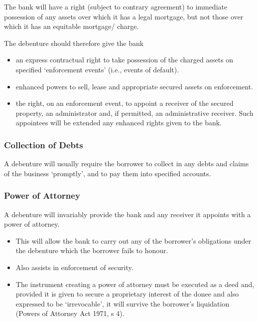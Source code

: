 \documentclass[
]{article}
\providecommand{\tightlist}{%
  \setlength{\itemsep}{0pt}\setlength{\parskip}{0pt}}
\begin{document}
The bank will have a right (subject to contrary agreement) to immediate
possession of any assets over which it has a legal mortgage, but not
those over which it has an equitable mortgage/ charge.

The debenture should therefore give the bank

\begin{itemize}
\tightlist
\item
  an express contractual right to take possession of the charged assets
  on specified `enforcement events' (i.e., events of default).
\item
  enhanced powers to sell, lease and appropriate secured assets on
  enforcement.
\item
  the right, on an enforcement event, to appoint a receiver of the
  secured property, an administrator and, if permitted, an
  administrative receiver. Such appointees will be extended any enhanced
  rights given to the bank.
\end{itemize}

\hypertarget{collection-of-debts}{%
\subsubsection{Collection of Debts}\label{collection-of-debts}}

A debenture will usually require the borrower to collect in any debts
and claims of the business `promptly', and to pay them into specified
accounts.

\hypertarget{power-of-attorney}{%
\subsubsection{Power of Attorney}\label{power-of-attorney}}

A debenture will invariably provide the bank and any receiver it
appoints with a power of attorney.

\begin{itemize}
\tightlist
\item
  This will allow the bank to carry out any of the borrower's
  obligations under the debenture which the borrower fails to honour.
\item
  Also assists in enforcement of security.
\item
  The instrument creating a power of attorney must be executed as a deed
  and, provided it is given to secure a proprietary interest of the
  donee and also expressed to be `irrevocable', it will survive the
  borrower's liquidation (Powers of Attorney Act 1971, s 4).
\end{itemize}
\end{document}
